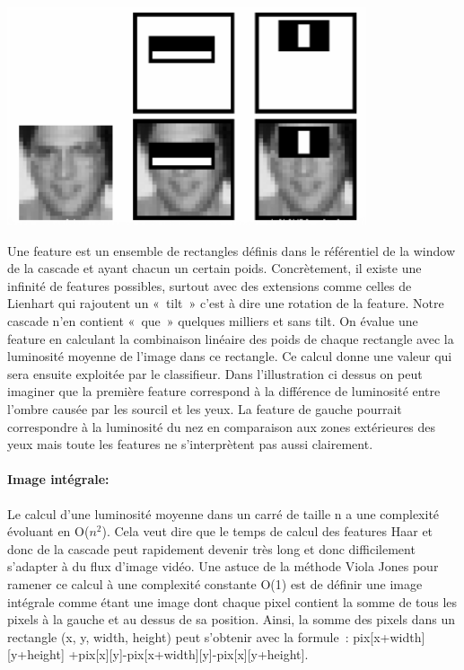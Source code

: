\documentclass[a4paper,11pt]{report}
\begin{document}
\includegraphics[width=300pt]{features.png}

	Une feature est un ensemble de rectangles définis dans le référentiel de la window de la cascade et ayant chacun un certain poids. Concrètement, il existe une infinité de features possibles, surtout avec des extensions comme celles de Lienhart qui rajoutent un « tilt » c’est à dire une rotation de la feature. Notre cascade n’en contient « que » quelques milliers et sans tilt. On évalue une feature en calculant la combinaison linéaire des poids de chaque rectangle avec la luminosité moyenne de l’image dans ce rectangle. Ce calcul donne une valeur qui sera ensuite exploitée par le classifieur. Dans l’illustration ci dessus on peut imaginer que la première feature correspond à la différence de luminosité entre l’ombre causée par les sourcil et les yeux. La feature de gauche pourrait correspondre à la luminosité du nez en comparaison aux zones extérieures des yeux mais toute les features ne s’interprètent pas aussi clairement.


\paragraph{Image intégrale:}
	Le calcul d’une luminosité moyenne dans un carré de taille n a une complexité évoluant en O($n^2$). Cela veut dire que le temps de calcul des features Haar et donc de la cascade peut rapidement devenir très long et donc difficilement s’adapter à du flux d’image vidéo. Une astuce de la méthode Viola Jones pour ramener ce calcul à une complexité constante O(1) est de définir une image intégrale comme étant une image dont chaque pixel contient la somme de tous les pixels à la gauche et au dessus de sa position. Ainsi, la somme des pixels dans un rectangle (x, y, width, height) peut s’obtenir avec la formule :  pix[x+width][y+height] +pix[x][y]-pix[x+width][y]-pix[x][y+height].
\end{document}
